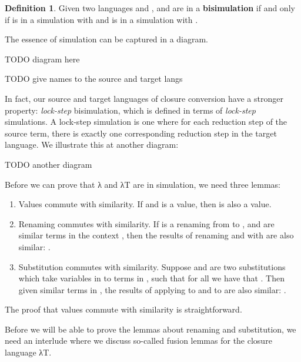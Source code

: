 \documentclass[bsc,frontabs,oneside,singlespacing,parskip,deptreport]{infthesis}
\theoremstyle{definition}
\newtheorem*{definition}{Definition}
\begin{document}
\begin{definition}
Given two languages  and ,   and  are in a
\textbf{bisimulation} if and only if  is in a simulation with  and
 is in a simulation with .
\end{definition}

The essence of simulation can be captured in a diagram.

TODO diagram here

TODO give names to the source and target langs

In fact, our source and target languages of closure conversion have a
stronger property: \textit{lock-step} bisimulation, which is defined
in terms of \textit{lock-step} simulations. A lock-step simulation is
one where for each reduction step of the source term, there is exactly
one corresponding reduction step in the target language. We illustrate
this at another diagram:

TODO another diagram

Before we can prove that λ and λT are in simulation, we need three
lemmas:

\begin{enumerate}
\item
  Values commute with similarity. If  and  is a
  value, then  is also a value.

\item
  Renaming commutes with similarity. If  is a renaming from
   to , and  are similar terms in the context
  , then the results of renaming  and  with 
  are also similar: .

\item
  Substitution commutes with similarity. Suppose  and  are two
  substitutions which take variables  in  to terms in ,
  such that for all  we have that . Then given similar terms  in , the results
  of applying  to  and  to  are also
  similar: .
\end{enumerate}

The proof that values commute with similarity is straightforward.


Before we will be able to prove the lemmas about renaming and substitution, we need an interlude
where we discuss so-called fusion lemmas for the closure language λT.
\end{document}
